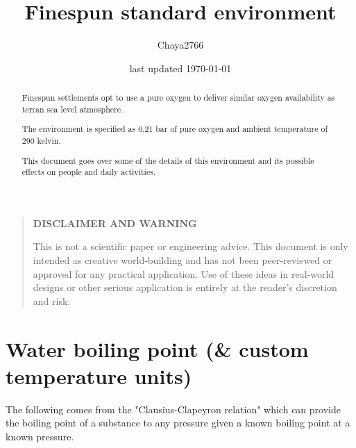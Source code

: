 \documentclass[a4paper]{article}
\title{Finespun standard environment}
\author{Chaya2766}
\date{last updated \today}
\begin{document}
	\sffamily
	\hyphenchar{}
	\sloppy
	
	\maketitle
	
	\begin{center}
	\end{center}
	
	\textbf{
		\sloppy
		\hyphenchar{}
		}
	
	\vfill
	
	\begin{abstract}
		Finespun settlements opt to use a pure oxygen to deliver similar oxygen availability as terran sea level atmosphere.
		
		\medskip
		
		The environment is specified as 0.21 bar of pure oxygen and ambient temperature of 290 kelvin.
		
		\medskip
		
		This document goes over some of the details of this environment and its possible effects on people and daily activities.
	\end{abstract}
	
	\vfill
	
	\begin{quote}
		\begin{center}
			\textbf{DISCLAIMER AND WARNING}
		\end{center}
		
		This is not a scientific paper or engineering advice.
		This document is only intended as creative world‑building and has not been peer‑reviewed or approved for any practical application.
		Use of these ideas in real‑world designs or other serious application is entirely at the reader’s discretion and risk.
	\end{quote}
	
	\vfill
	
	\tableofcontents
	
	\pagebreak
	
	\section{Water boiling point (\& custom temperature units)}
	
	The following comes from the "Clausius-Clapeyron relation" which can provide the boiling point of a substance to any pressure given a known boiling point at a known pressure.
	
\end{document}
